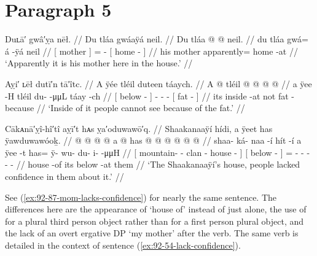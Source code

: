 \section{Paragraph 5}\label{sec:92-para-5}

\ex\label{ex:92-112-his-mother-at-home}%
%
\begingl
	\glpreamble	Duʟā′ gwâ′ỵa nēł. //
	\glpreamble	Du tláa gwáaÿá neil. //
	\gla	{} Du tláa {}  @ {} @ {}
		{} neil. {} {} //
	\glb	{} du tláa {} gwá= á -ÿá
		{} neil {} {} //
	\glc	{}[  mother {}] =  -
		{}[ home - {}] //
	\gld	{} his mother {} apparently=  {}
		{} home -at {} //
	\glft	‘Apparently it is his mother here in the house.’
		//
\endgl
\xe

\ex\label{ex:92-113-inside-cant-see-because-fat}%
%
\begingl
	\glpreamble	Aỵi′ ʟēł dutī′n tā′îtc. //
	\glpreamble	A ÿée tléil duteen táaych. //
	\gla	{} A  @ {} {}
		tléil  @ {} @ {} @ {}
		{}  @ {} {} //
	\glb	{} a ÿee -H {}
		tléil {} du-  -μμL
		{} táay -ch {} //
	\glc	{}[  below - {}]
		 - -  -
		{}[ fat - {}] //
	\gld	{} its inside -at {}
		not  {} {} {}
		{} fat -because {} //
	\glft	‘Inside of it people cannot see because of the fat.’
		//
\endgl
\xe

\ex\label{ex:92-114-lacked-confidence}%
%
\begingl
	\glpreamble	Cākᴀnā′ỵî-hî′tî aỵī′t hᴀs ỵa′oduwawō′q. //
	\glpreamble	Shaakanaaÿí hídi, a ÿeet has ÿawduwawóoḵ. //
	\gla	{}  @ {} @ {} @ {}  @ {} {}
		{} a  @ {} {}
		has @  @ {} @ {} @ {} @ {} @ {} //
	\glb	{} shaa- ká- naa -í hít -í {}
		{} a ÿee -t {}
		has= ÿ- wu- du- i-  -μμH  //
	\glc	{}[ mountain- - clan - house - {}]
		{}[  below - {}]
		= - - - -
			 - //
	\gld	{}  {} {} {} house -of {}
		{} its below -at {}
		them  {} {} {} {} {} //
	\glft	‘The Shaakanaaÿí’s house, people lacked confidence in them about it.’
		//
\endgl
\xe

See (\ref{ex:92-87-mom-lacks-confidence}) for nearly the same sentence.
The differences here are the appearance of  ‘house of’ instead of just  alone, the use of  for a plural third person object rather than  for a first person plural object, and the lack of an overt ergative DP  ‘my mother’ after the verb.
The same verb is detailed in the context of sentence (\ref{ex:92-54-lack-confidence}).

